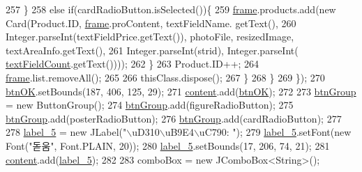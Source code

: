\begin{DoxyCode}
257                     \}
258                     \textcolor{keywordflow}{else} \textcolor{keywordflow}{if}(cardRadioButton.isSelected())\{
259                         \hyperlink{classpkg_1_1_product_u_i_a49f9ae805cdac34c866e6c1593b6e625}{frame}.products.add(\textcolor{keyword}{new} Card(Product.ID, \hyperlink{classpkg_1_1_product_u_i_a49f9ae805cdac34c866e6c1593b6e625}{frame}.proContent, textFieldName.
      getText(),
260                                 Integer.parseInt(textFieldPrice.getText()), photoFile, resizedImage, 
      textAreaInfo.getText(),
261                                 Integer.parseInt(strid), Integer.parseInt(
      \hyperlink{classpkg_1_1_product_u_i_ac35d0e67c152e5bcc6cdf3b9cc79f90b}{textFieldCount}.getText())));
262                     \}
263                     Product.ID++;
264                     \hyperlink{classpkg_1_1_product_u_i_a49f9ae805cdac34c866e6c1593b6e625}{frame}.list.removeAll();
265                         
266                     thisClass.dispose();
267                 \}
268             \}
269         \});
270         \hyperlink{classpkg_1_1_product_u_i_ae48c36617559f56735461306acc07166}{btnOK}.setBounds(187, 406, 125, 29);
271         \hyperlink{classpkg_1_1_product_u_i_a4b906446ebd18ba32a11ace86f26fe12}{content}.add(\hyperlink{classpkg_1_1_product_u_i_ae48c36617559f56735461306acc07166}{btnOK});
272         
273         \hyperlink{classpkg_1_1_product_u_i_ab210713d01b5e5e2f116bd0367d95d6f}{btnGroup} = \textcolor{keyword}{new} ButtonGroup();
274         \hyperlink{classpkg_1_1_product_u_i_ab210713d01b5e5e2f116bd0367d95d6f}{btnGroup}.add(figureRadioButton);
275         \hyperlink{classpkg_1_1_product_u_i_ab210713d01b5e5e2f116bd0367d95d6f}{btnGroup}.add(posterRadioButton);
276         \hyperlink{classpkg_1_1_product_u_i_ab210713d01b5e5e2f116bd0367d95d6f}{btnGroup}.add(cardRadioButton);
277         
278         \hyperlink{classpkg_1_1_product_u_i_a15bb6a2e073f1c9db2fd7289afd4dd5e}{label\_5} = \textcolor{keyword}{new} JLabel(\textcolor{stringliteral}{"\(\backslash\)uD310\(\backslash\)uB9E4\(\backslash\)uC790: "});
279         \hyperlink{classpkg_1_1_product_u_i_a15bb6a2e073f1c9db2fd7289afd4dd5e}{label\_5}.setFont(\textcolor{keyword}{new} Font(\textcolor{stringliteral}{"돋움"}, Font.PLAIN, 20));
280         \hyperlink{classpkg_1_1_product_u_i_a15bb6a2e073f1c9db2fd7289afd4dd5e}{label\_5}.setBounds(17, 206, 74, 21);
281         \hyperlink{classpkg_1_1_product_u_i_a4b906446ebd18ba32a11ace86f26fe12}{content}.add(\hyperlink{classpkg_1_1_product_u_i_a15bb6a2e073f1c9db2fd7289afd4dd5e}{label\_5});
282         
283         comboBox = \textcolor{keyword}{new} JComboBox<String>();

\end{DoxyCode}
